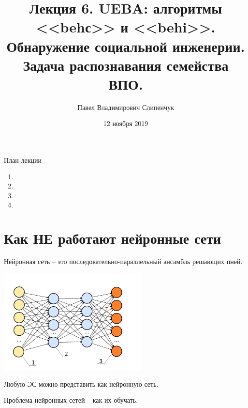 


\title{Лекция 6. UEBA: алгоритмы <<behс>> и <<behi>>. Обнаружение социальной инженерии. Задача распознавания семейства ВПО.}

\date{12 ноября 2019}
\author{Павел Владимирович Слипенчук }


  \maketitle
    
\begin{frame}{План лекции}
    \begin{enumerate}
    	\item {}
		\item {}
		\item {}
		\item {}
	\end{enumerate}
\end{frame}

\section{Как НЕ работают нейронные сети}\label{section:nn_no_work}

\begin{frame}
	\small
	Нейронная сеть -- это последовательно-параллельный ансамбль решающих пней.
	
	\begin{center}
		\includegraphics[width=7.5cm]{../pic/nn_example.png}\centering
	\end{center}
	
	Любую ЭС можно представить как нейронную сеть.
	
	Проблема нейронных сетей -- как их обучать.
\end{frame}


